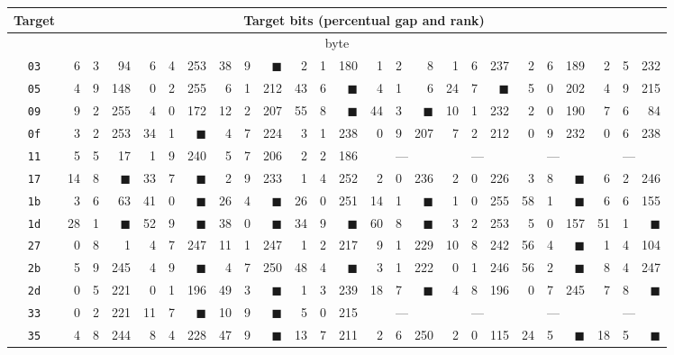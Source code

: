 \begin{tabular}{| c | r@{.} l@{\quad}r | r@{.} l@{\quad}r | r@{.} l@{\quad}r | r@{.} l@{\quad}r | r@{.} l@{\quad}r | r@{.} l@{\quad}r | r@{.} l@{\quad}r | r@{.} l@{\quad}r |}
	\hline
	Target & \multicolumn{24}{c|}{Target bits (percentual gap and rank)} \\
	\hline
	\hline
	\multicolumn{25}{|c|}{\nth{1} byte} \\
	\hline
	{\tt 03}&6&3&94&6&4&253&38&9&{$\blacksquare$}&2&1&180&1&2&8&1&6&237&2&6&189&2&5&232\\
	\hline
	{\tt 05}&4&9&148&0&2&255&6&1&212&43&6&{$\blacksquare$}&4&1&6&24&7&{$\blacksquare$}&5&0&202&4&9&215\\
	\hline
	{\tt 09}&9&2&255&4&0&172&12&2&207&55&8&{$\blacksquare$}&44&3&{$\blacksquare$}&10&1&232&2&0&190&7&6&84\\
	\hline
	{\tt 0f}&3&2&253&34&1&{$\blacksquare$}&4&7&224&3&1&238&0&9&207&7&2&212&0&9&232&0&6&238\\
	\hline
	{\tt 11}&5&5&17&1&9&240&5&7&206&2&2&186&\multicolumn{3}{c|}{---}&\multicolumn{3}{c|}{---}&\multicolumn{3}{c|}{---}&\multicolumn{3}{c|}{---}\\
	\hline
	{\tt 17}&14&8&{$\blacksquare$}&33&7&{$\blacksquare$}&2&9&233&1&4&252&2&0&236&2&0&226&3&8&{\weak$\blacksquare$}&6&2&246\\
	\hline
	{\tt 1b}&3&6&63&41&0&{$\blacksquare$}&26&4&{$\blacksquare$}&26&0&251&14&1&{$\blacksquare$}&1&0&255&58&1&{$\blacksquare$}&6&6&155\\
	\hline
	{\tt 1d}&28&1&{$\blacksquare$}&52&9&{$\blacksquare$}&38&0&{$\blacksquare$}&34&9&{$\blacksquare$}&60&8&{$\blacksquare$}&3&2&253&5&0&157&51&1&{$\blacksquare$}\\
	\hline
	{\tt 27}&0&8&1&4&7&247&11&1&247&1&2&217&9&1&229&10&8&242&56&4&{$\blacksquare$}&1&4&104\\
	\hline
	{\tt 2b}&5&9&245&4&9&{\weak$\blacksquare$}&4&7&250&48&4&{$\blacksquare$}&3&1&222&0&1&246&56&2&{$\blacksquare$}&8&4&247\\
	\hline
	{\tt 2d}&0&5&221&0&1&196&49&3&{$\blacksquare$}&1&3&239&18&7&{$\blacksquare$}&4&8&196&0&7&245&7&8&{\weak$\blacksquare$}\\
	\hline
	{\tt 33}&0&2&221&11&7&{$\blacksquare$}&10&9&{$\blacksquare$}&5&0&215&\multicolumn{3}{c|}{---}&\multicolumn{3}{c|}{---}&\multicolumn{3}{c|}{---}&\multicolumn{3}{c|}{---}\\
	\hline
	{\tt 35}&4&8&244&8&4&228&47&9&{$\blacksquare$}&13&7&211&2&6&250&2&0&115&24&5&{$\blacksquare$}&18&5&{$\blacksquare$}\\

\end{tabular}

